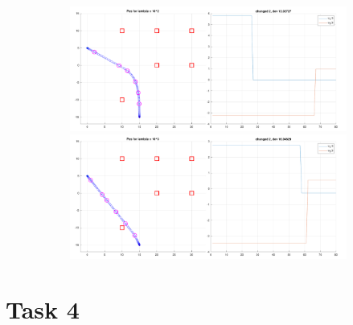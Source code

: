 \begin{figure}[!htb]
\begin{subfigure}
\end{subfigure}
\begin{subfigure}
    \centering
    \includegraphics[width=0.5\linewidth]{part1/figures/task3/3_2.pdf}\hspace{0em}
    \includegraphics[width=0.5\linewidth]{part1/figures/task3/3_3.pdf}
\end{subfigure}
\end{figure}

\section{Task 4}


